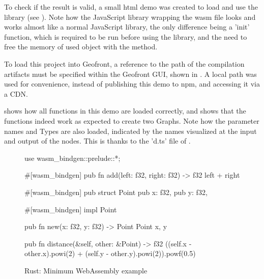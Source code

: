 To check if the result is valid, a small html demo was created to load and use the library (see ).
Note how the JavaScript library wrapping the wasm file looks and works almost like a normal JavaScript library, the only difference being a 'init' function, which is required to be run before using the library, and the need to free the memory of used object with the  method.

To load this project into Geofront, a reference to the path of the compilation artifacts must be specified within the Geofront GUI, shown in .
A local path was used for convenience, instead of publishing this demo to npm, and accessing it via a \ac{CDN}.

 shows how all functions in this demo are loaded correctly, and  shows that the functions indeed work as expected to create two Graphs. 
Note how the parameter names and Types are also loaded, indicated by the names visualized at the input and output of the nodes.
This is thanks to the 'd.ts' file of .

\begin{figure}
\begin{code}
use wasm_bindgen::prelude::*;

#[wasm_bindgen]
pub fn add(left: f32, right: f32) -> f32 {
    left + right
}

#[wasm_bindgen]
pub struct Point {
    pub x: f32,
    pub y: f32,
}

#[wasm_bindgen]
impl Point {

    pub fn new(x: f32, y: f32) -> Point {
        Point { x, y }
    }

    pub fn distance(&self, other: &Point) -> f32 {
        ((self.x - other.x).powi(2) + (self.y - other.y).powi(2)).powf(0.5) 
    }
}
\end{code}
\centering
\caption{Rust: Minimum WebAssembly example}
\label{fig:minimum-rust-wasm}
\end{figure}

